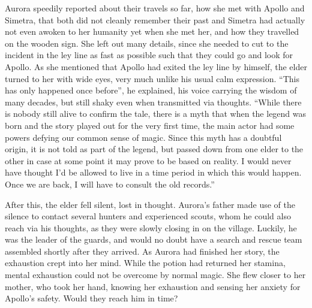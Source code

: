 Aurora speedily reported about their travels so far, how she met with Apollo and Simetra, that both did not cleanly remember their past and Simetra had actually not even awoken to her humanity yet when she met her, and how they travelled on the wooden sign. She left out many details, since she needed to cut to the incident in the ley line as fast as possible such that they could go and look for Apollo. As she mentioned that Apollo had exited the ley line by himself, the elder turned to her with wide eyes, very much unlike his usual calm expression. \enquote{This has only happened once before}, he explained, his voice carrying the wisdom of many decades, but still shaky even when transmitted via thoughts. \enquote{While there is nobody still alive to confirm the tale, there is a myth that when the legend was born and the story played out for the very first time, the main actor had some powers defying our common sense of magic. Since this myth has a doubtful origin, it is not told as part of the legend, but passed down from one elder to the other in case at some point it may prove to be based on reality. I would never have thought I'd be allowed to live in a time period in which this would happen. Once we are back, I will have to consult the old records.}

After this, the elder fell silent, lost in thought. Aurora's father made use of the silence to contact several hunters and experienced scouts, whom he could also reach via his thoughts, as they were slowly closing in on the village. Luckily, he was the leader of the guards, and would no doubt have a search and rescue team assembled shortly after they arrived. As Aurora had finished her story, the exhaustion crept into her mind. While the potion had returned her stamina, mental exhaustion could not be overcome by normal magic. She flew closer to her mother, who took her hand, knowing her exhaustion and sensing her anxiety for Apollo's safety. Would they reach him in time?
